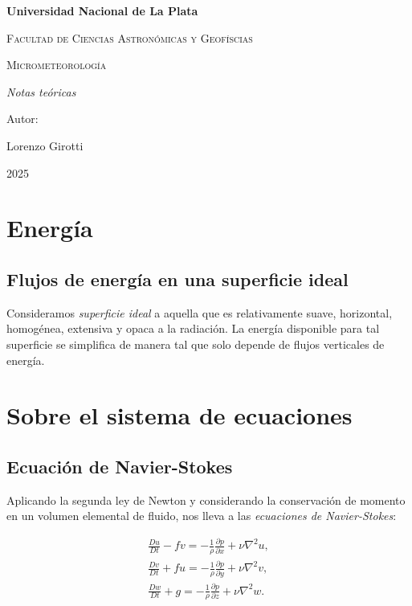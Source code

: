 \documentclass[openany,a4]{book}
\begin{document}
\begin{titlepage}
    \centering
    {\bfseries\LARGE Universidad Nacional de La Plata \par}\vspace{1cm}
    {\scshape\Large Facultad de Ciencias Astronómicas y Geofíscias \par}\vspace{3cm}
    {\scshape\Huge Micrometeorología \par}\vspace{3cm}
    {\itshape\Large Notas teóricas \par}
    \vfill
    {\Large Autor: \par}
    {\Large Lorenzo Girotti \par}
    \vfill
    {\Large 2025 \par}
\end{titlepage}

\sffamily


\chapter{Energía}

\section{Flujos de energía en una superficie ideal}

Consideramos \emph{superficie ideal} a aquella que es relativamente 
suave, horizontal, homogénea, extensiva y opaca a la radiación. 
La energía disponible para tal superficie se simplifica de manera 
tal que solo depende de flujos verticales de energía.

\chapter{Sobre el sistema de ecuaciones}

\section{Ecuación de Navier-Stokes}
Aplicando la segunda ley de Newton y considerando la 
conservación de momento en un volumen elemental de fluido, 
nos lleva a las \emph{ecuaciones de Navier-Stokes}:

\begin{gather}
   \frac{Du}{Dt}-fv=-\frac{1}{\rho}\frac{\partial p}{\partial x}+\nu\nabla^{2}u,\\
   \frac{Dv}{Dt}+fu=-\frac{1}{\rho}\frac{\partial p}{\partial y}+\nu\nabla^{2}v,\\
   \frac{Dw}{Dt}+g=-\frac{1}{\rho}\frac{\partial p}{\partial z}+\nu\nabla^{2}w.
\end{gather}
\end{document}
